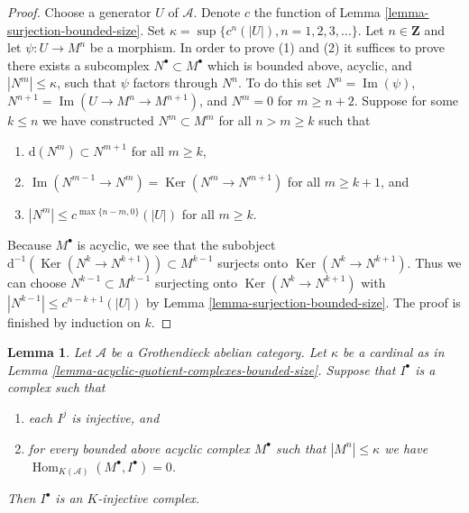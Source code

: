 \documentclass{stacks-project}
\theoremstyle{plain}
\newtheorem{lemma}[subsection]{Lemma}
\theoremstyle{definition}
\theoremstyle{remark}
\numberwithin{equation}{subsection}
\def\Hom{\mathop{\mathrm{Hom}}\nolimits}
\def\Ker{\mathop{\mathrm{Ker}}}
\def\Im{\mathop{\mathrm{Im}}}
\begin{document}
\begin{proof}
Choose a generator $U$ of $\mathcal{A}$. Denote $c$ the function of
Lemma \ref{lemma-surjection-bounded-size}.
Set $\kappa = \sup \{c^n(|U|), n = 1, 2, 3, \ldots\}$.
Let $n \in \mathbf{Z}$ and let $\psi : U \to M^n$ be a morphism.
In order to prove (1) and (2) it suffices to prove there exists a subcomplex
$N^\bullet \subset M^\bullet$ which is bounded above, acyclic, and
$|N^m| \leq \kappa$, such that $\psi$ factors through $N^n$.
To do this set $N^n = \Im(\psi)$, $N^{n + 1} = \Im(U \to M^n \to M^{n + 1})$,
and $N^m = 0$ for $m \geq n + 2$.
Suppose for some $k \leq n$ we have constructed $N^m \subset M^m$
for all $n > m \geq k$ such that
\begin{enumerate}
\item $\text{d}(N^m) \subset N^{m + 1}$ for all $m \geq k$,
\item $\Im(N^{m - 1} \to N^m) = \Ker(N^m \to N^{m + 1})$ for
all $m \geq k + 1$, and
\item $|N^m| \leq c^{\max\{n - m, 0\}}(|U|)$ for all $m \geq k$.
\end{enumerate}
Because $M^\bullet$ is acyclic, we see that the subobject
$\text{d}^{-1}(\Ker(N^k \to N^{k + 1})) \subset M^{k - 1}$ surjects onto
$\Ker(N^k \to N^{k + 1})$. Thus we can choose $N^{k - 1} \subset M^{k - 1}$
surjecting onto $\Ker(N^k \to N^{k + 1})$ with
$|N^{k - 1}| \leq c^{n - k + 1}(|U|)$ by
Lemma \ref{lemma-surjection-bounded-size}. The proof is finished by
induction on $k$.
\end{proof}

\begin{lemma}
\label{lemma-characterize-K-injective}
Let $\mathcal{A}$ be a Grothendieck abelian category.
Let $\kappa$ be a cardinal as in
Lemma \ref{lemma-acyclic-quotient-complexes-bounded-size}.
Suppose that $I^\bullet$ is a complex such that
\begin{enumerate}
\item each $I^j$ is injective, and
\item for every bounded above acyclic complex $M^\bullet$
such that $|M^n| \leq \kappa$
we have $\Hom_{K(\mathcal{A})}(M^\bullet, I^\bullet) = 0$.
\end{enumerate}
Then $I^\bullet$ is an $K$-injective complex.
\end{lemma}
\end{document}
